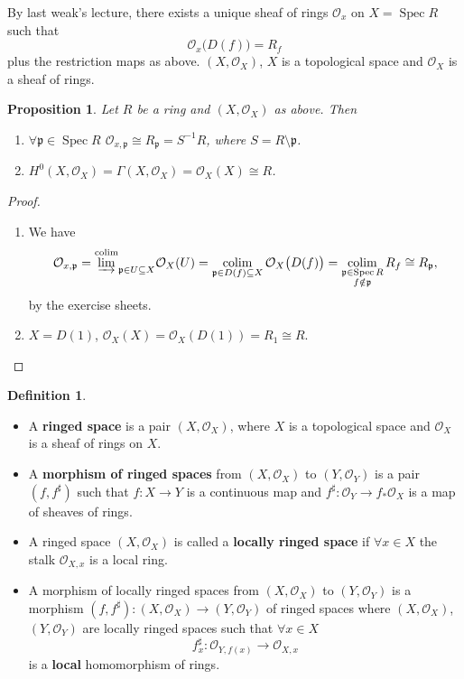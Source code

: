 \documentclass[12pt]{article}
\DeclareMathOperator{\Spec}{Spec}
\DeclareMathOperator*{\colim}{colim}
\newtheorem*{proposition}{Proposition}
\theoremstyle{definition}
\newtheorem*{definition}{Definition}
\theoremstyle{remark}
\begin{document}
By last weak's lecture, there exists a unique sheaf of rings $\mathcal{O}_x$ on $X=\Spec R$ such that
\[\mathcal{O}_x\big(D(f)\big)=R_f\]
plus the restriction maps as above. $(X,\mathcal{O}_X)$, $X$ is a topological space and $\mathcal{O}_X$ is a sheaf of rings.

\begin{proposition}
Let $R$ be a ring and $(X,\mathcal{O}_X)$ as above. Then
\begin{enumerate}[label=\arabic*)]
\item $\forall\mathfrak{p}\in\Spec R$ $\mathcal{O}_{x,\mathfrak{p}}\cong R_{\mathfrak{p}}=S^{-1}R$, where $S=R\setminus\mathfrak{p}$.

\item $H^0(X,\mathcal{O}_X)=\Gamma(X,\mathcal{O}_X)=\mathcal{O}_X(X)\cong R$.
\end{enumerate}
\end{proposition}

\begin{proof}
\begin{enumerate}[label=\arabic*)]
\item We have
\[\mathcal{O}_{x,\mathfrak{p}}=\overset{\colim}{\varinjlim}_{\mathfrak{p}\in U\subseteq X}\mathcal{O}_X(U)=\colim_{\mathfrak{p}\in D(f)\subseteq X}\mathcal{O}_X\big(D(f)\big)=\colim_{\substack{\mathfrak{p}\in\Spec R\\f\notin\mathfrak{p}}}R_f\cong R_{\mathfrak{p}},\]
by the exercise sheets.

\item $X=D(1)$, $\mathcal{O}_X(X)=\mathcal{O}_X(D(1))=R_1\cong R$.
\end{enumerate}
\end{proof}

\begin{definition}
\begin{itemize}
\item A \textbf{ringed space} is a pair $(X,\mathcal{O}_X)$, where $X$ is a topological space and $\mathcal{O}_X$ is a sheaf of rings on $X$.

\item A \textbf{morphism of ringed spaces} from $(X,\mathcal{O}_X)$ to $(Y,\mathcal{O}_Y)$ is a pair $(f,f^{\sharp})$ such that $f:X\rightarrow Y$ is a continuous map and $f^{\sharp}:\mathcal{O}_Y\rightarrow f_*\mathcal{O}_X$ is a map of sheaves of rings.

\item A ringed space $(X,\mathcal{O}_X)$ is called a \textbf{locally ringed space} if $\forall x\in X$ the stalk $\mathcal{O}_{X,x}$ is a local ring.

\item A morphism of locally ringed spaces from $(X,\mathcal{O}_X)$ to $(Y,\mathcal{O}_Y)$ is a morphism $(f,f^{\sharp}):(X,\mathcal{O}_X)\rightarrow(Y,\mathcal{O}_Y)$ of ringed spaces where $(X,\mathcal{O}_X)$, $(Y,\mathcal{O}_Y)$ are locally ringed spaces such that $\forall x\in X$
\[f_x^{\sharp}:\mathcal{O}_{Y,f(x)}\longrightarrow\mathcal{O}_{X,x}\]
is a \textbf{local} homomorphism of rings.
\end{itemize}
\end{definition}
\end{document}
